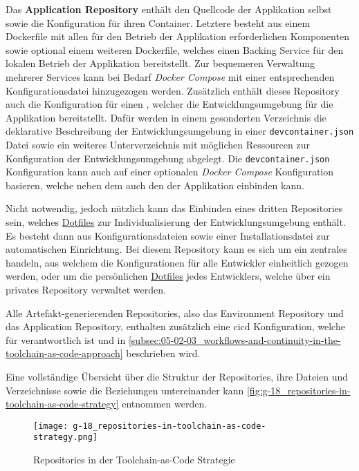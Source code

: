 Das \textbf{Application Repository} enthält den Quellcode der Applikation selbst sowie die Konfiguration für ihren Container. Letztere besteht aus einem Dockerfile mit allen für den Betrieb der Applikation erforderlichen Komponenten sowie optional einem weiteren Dockerfile, welches einen Backing Service für den lokalen Betrieb der Applikation bereitstellt. Zur bequemeren Verwaltung mehrerer Services kann bei Bedarf \textit{Docker Compose} mit einer entsprechenden Konfigurationsdatei hinzugezogen werden. Zusätzlich enthält dieses Repository auch die Konfiguration für einen , welcher die Entwicklungsumgebung für die Applikation bereitstellt. \linebreak[4]
Dafür werden in einem gesonderten Verzeichnis die deklarative Beschreibung der Entwicklungsumgebung in einer \texttt{devcontainer.json} Datei sowie ein weiteres Unterverzeichnis mit möglichen Ressourcen zur Konfiguration der Entwicklungsumgebung abgelegt. Die \texttt{devcontainer.json} Konfiguration kann auch auf einer optionalen \textit{Docker Compose} Konfiguration basieren, welche neben dem  auch den  der Applikation einbinden kann.

Nicht notwendig, jedoch nützlich kann das Einbinden eines dritten Repositories sein, welches \hyperref[sec:03-04_dotfiles]{Dotfiles} zur Individualisierung der Entwicklungsumgebung enthält. Es besteht dann aus Konfigurationsdateien sowie einer Installationsdatei zur automatischen Einrichtung. Bei diesem Repository kann es sich um ein zentrales handeln, aus welchem die Konfigurationen für alle Entwickler einheitlich gezogen werden, oder um die persönlichen \hyperref[sec:03-04_dotfiles]{Dotfiles} jedes Entwicklers, welche über ein privates Repository verwaltet werden.

Alle Artefakt-generierenden Repositories, also das Environment Repository und das Application Repository, enthalten zusätzlich eine \Gls{cicd} Konfiguration, welche für  verantwortlich ist und in \autoref{subsec:05-02-03_workflows-and-continuity-in-the-toolchain-as-code-approach} beschrieben wird.

Eine vollständige Übersicht über die Struktur der Repositories, ihre Dateien und Verzeichnisse sowie die Beziehungen untereinander kann \autoref{fig:g-18_repositories-in-toolchain-as-code-strategy} entnommen werden.

\begin{figure}[htp]
    \centering
    \texttt{[image: g-18\_repositories-in-toolchain-as-code-strategy.png]}
    \caption{Repositories in der Toolchain-as-Code Strategie}
    \label{fig:g-18_repositories-in-toolchain-as-code-strategy}
\end{figure}

